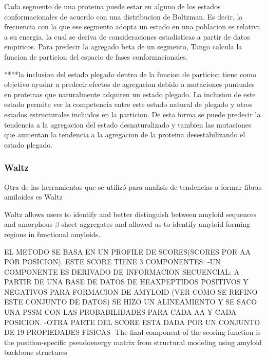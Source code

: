 Cada segmento de una proteina puede estar en alguno de los estados conformacionales de acuerdo con una distribucion de Boltzman. Es decir, la frecuencia con la que ese segmento adopta un estado en una poblacion es relativa a su energia, la cual se deriva de consideraciones estadisticas a partir de datos empiricos.  
Para predecir la agregado beta de un segmento, Tango calcula la funcion de particion del espacio de fases conformacionales.


****la inclusion del estado plegado dentro de la funcion de particion tiene como objetivo ayudar a predecir efectos de agregacion debido a mutaciones puntuales en proteinas que naturalmente adquiren un estado plegado. La inclusion de este estado permite ver la competencia entre este estado natural de plegado y otros estados estructurales incluidos en la particion. De esta forma se puede predecir la tendencia a la agregacion del estado desnaturalizado y tambien las mutaciones que aumentan la tendencia a la agregacion de la proteina desestabilizando el estado plegado.









\subsubsection{Waltz}


Otra de las herramientas que se utilizó para analisis de tendencias a formar fibras amiloides es Waltz \cite{maurer2010exploring}

Waltz allows users to identify and better distinguish between amyloid sequences and amorphous $\beta$-sheet aggregates and allowed us to identify
amyloid-forming regions in functional amyloids.

EL METODO SE BASA EN UN PROFILE DE SCORES(SCORES POR AA POR POSICION). ESTE SCORE TIENE 3 COMPONENTES:
-UN COMPONENTE ES DERIVADO DE INFORMACION SECUENCIAL: A PARTIR DE UNA BASE DE DATOS DE HEAXPEPTIDOS POSITIVOS Y NEGATIVOS PARA FORMACION DE AMYLOID (VER COMO SE REFINO ESTE CONJUNTO DE DATOS) 
SE HIZO UN ALINEAMIENTO Y SE SACO UNA PSSM CON LAS PROBABILIDADES PARA CADA AA Y CADA POSICION.
-OTRA PARTE DEL SCORE ESTA DADA POR UN CONJUNTO DE 19 PROPIEDADES FISICAS 
-The final component of the scoring function is the position-specific pseudoenergy matrix from structural modeling using amyloid backbone structures

